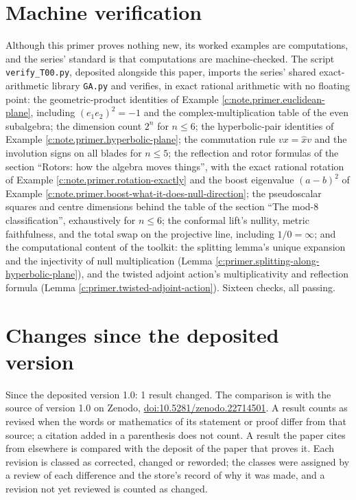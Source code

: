 \documentclass[11pt]{article}
\theoremstyle{definition}
\theoremstyle{plain}
\begin{document}
\section{Machine verification}

\label{c:note.primer.setting-machine-verification}
Although this primer proves nothing new, its worked examples are computations, and the series' standard is that computations are machine-checked. The script \texttt{verify\_T00.py}, deposited alongside this paper, imports the series' shared exact-arithmetic library \texttt{GA.py} and verifies, in exact rational arithmetic with no floating point: the geometric-product identities of Example \ref{c:note.primer.euclidean-plane}, including $(e_1e_2)^2 = -1$ and the complex-multiplication table of the even subalgebra; the dimension count $2^{n}$ for $n \leq 6$; the hyperbolic-pair identities of Example \ref{c:note.primer.hyperbolic-plane}; the commutation rule $vx = \hat{x}v$ and the involution signs on all blades for $n \leq 5$; the reflection and rotor formulas of the section ``Rotors: how the algebra moves things'', with the exact rational rotation of Example \ref{c:note.primer.rotation-exactly} and the boost eigenvalue $(a-b)^{2}$ of Example \ref{c:note.primer.boost-what-it-does-null-direction}; the pseudoscalar squares and centre dimensions behind the table of the section ``The mod-8 classification'', exhaustively for $n \leq 6$; the conformal lift's nullity, metric faithfulness, and the total swap on the projective line, including $1/0 = \infty$; and the computational content of the toolkit: the splitting lemma's unique expansion and the injectivity of null multiplication (Lemma \ref{c:primer.splitting-along-hyperbolic-plane}), and the twisted adjoint action's multiplicativity and reflection formula (Lemma \ref{c:primer.twisted-adjoint-action}). Sixteen checks, all passing.

\section*{Changes since the deposited version}
Since the deposited version 1.0: 1 result changed. The comparison is with the source of version 1.0 on Zenodo, \href{https://doi.org/10.5281/zenodo.22714501}{doi:10.5281/zenodo.22714501}. A result counts as revised when the words or mathematics of its statement or proof differ from that source; a citation added in a parenthesis does not count. A result the paper cites from elsewhere is compared with the deposit of the paper that proves it. Each revision is classed as corrected, changed or reworded; the classes were assigned by a review of each difference and the store's record of why it was made, and a revision not yet reviewed is counted as changed.
\end{document}
